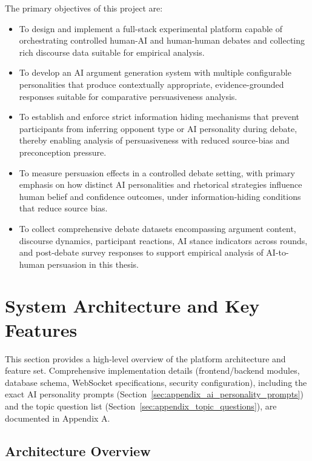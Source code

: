 The primary objectives of this project are:

\begin{itemize}
    \item To design and implement a full-stack experimental platform capable of orchestrating
    controlled human-AI and human-human debates and collecting rich discourse data suitable for empirical
    analysis.

    \item To develop an AI argument generation system with multiple configurable personalities
    that produce contextually appropriate, evidence-grounded responses suitable for comparative
    persuasiveness analysis.

    \item To establish and enforce strict information hiding mechanisms that prevent participants
    from inferring opponent type or AI personality during debate, thereby enabling analysis of
    persuasiveness with reduced source-bias and preconception pressure.

    \item To measure persuasion effects in a controlled debate setting, with primary emphasis on
    how distinct AI personalities and rhetorical strategies influence human belief and confidence outcomes,
    under information-hiding conditions that reduce source bias.

    \item To collect comprehensive debate datasets encompassing argument content, discourse
    dynamics, participant reactions, AI stance indicators across rounds, and post-debate survey responses
    to support empirical analysis of AI-to-human persuasion in this thesis.
\end{itemize}

\section{System Architecture and Key Features}

This section provides a high-level overview of the platform architecture and feature set.
Comprehensive implementation details (frontend/backend modules, database schema,
WebSocket specifications, security configuration), including the exact AI
personality prompts (Section~\ref{sec:appendix_ai_personality_prompts}) and the
topic question list (Section~\ref{sec:appendix_topic_questions}), are documented
in Appendix A.

\subsection{Architecture Overview}

